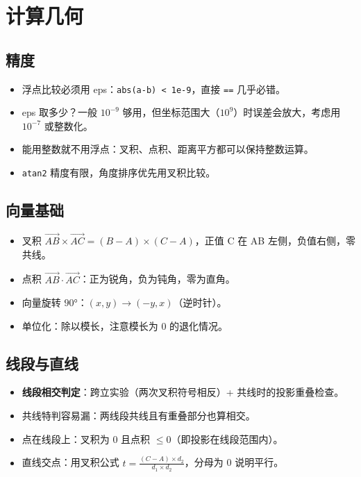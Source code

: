\documentclass[UTF8,openany,oneside,zihao=-4]{ctexbook}
\begin{document}
\chapter{计算几何}

\section{精度}

\begin{warn}
\begin{itemize}
  \item 浮点比较必须用 eps：\lstinline|abs(a-b) < 1e-9|，直接 \lstinline|==| 几乎必错。
  \item eps 取多少？一般 $10^{-9}$ 够用，但坐标范围大（$10^9$）时误差会放大，考虑用 $10^{-7}$ 或整数化。
  \item 能用整数就不用浮点：叉积、点积、距离平方都可以保持整数运算。
  \item \lstinline|atan2| 精度有限，角度排序优先用叉积比较。
\end{itemize}
\end{warn}

\section{向量基础}

\begin{itemize}
  \item 叉积 $\vec{AB} \times \vec{AC} = (B-A) \times (C-A)$，正值 C 在 AB 左侧，负值右侧，零共线。
  \item 点积 $\vec{AB} \cdot \vec{AC}$：正为锐角，负为钝角，零为直角。
  \item 向量旋转 $90°$：$(x,y) \to (-y,x)$（逆时针）。
  \item 单位化：除以模长，注意模长为 0 的退化情况。
\end{itemize}

\section{线段与直线}

\begin{itemize}
  \item \textbf{线段相交判定}：跨立实验（两次叉积符号相反）+ 共线时的投影重叠检查。
  \item 共线特判容易漏：两线段共线且有重叠部分也算相交。
  \item 点在线段上：叉积为 0 且点积 $\le 0$（即投影在线段范围内）。
  \item 直线交点：用叉积公式 $t = \frac{(C-A)\times d_2}{d_1 \times d_2}$，分母为 0 说明平行。
\end{itemize}
\end{document}
